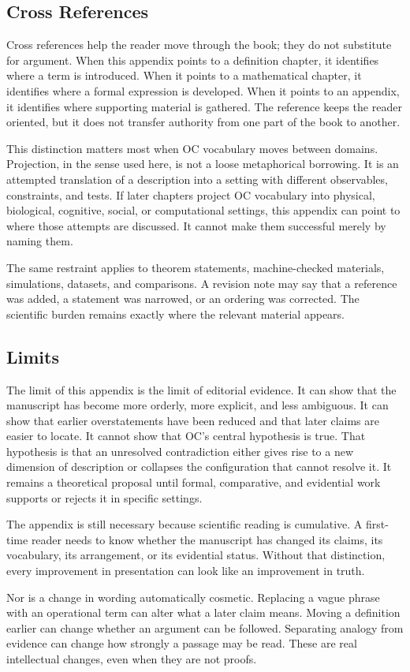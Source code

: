 \documentclass[11pt,a4paper,openany]{book}
\begin{document}
\subsection{Cross References}
Cross references help the reader move through the book; they do not substitute for argument. When this appendix points to a definition chapter, it identifies where a term is introduced. When it points to a mathematical chapter, it identifies where a formal expression is developed. When it points to an appendix, it identifies where supporting material is gathered. The reference keeps the reader oriented, but it does not transfer authority from one part of the book to another. \cite{grimmett_percolation,goldenfeld_lectures}\par
This distinction matters most when OC vocabulary moves between domains. Projection, in the sense used here, is not a loose metaphorical borrowing. It is an attempted translation of a description into a setting with different observables, constraints, and tests. If later chapters project OC vocabulary into physical, biological, cognitive, social, or computational settings, this appendix can point to where those attempts are discussed. It cannot make them successful merely by naming them.\par
The same restraint applies to theorem statements, machine-checked materials, simulations, datasets, and comparisons. A revision note may say that a reference was added, a statement was narrowed, or an ordering was corrected. The scientific burden remains exactly where the relevant material appears.\par
\subsection{Limits}
The limit of this appendix is the limit of editorial evidence. It can show that the manuscript has become more orderly, more explicit, and less ambiguous. It can show that earlier overstatements have been reduced and that later claims are easier to locate. It cannot show that OC's central hypothesis is true. That hypothesis is that an unresolved contradiction either gives rise to a new dimension of description or collapses the configuration that cannot resolve it. It remains a theoretical proposal until formal, comparative, and evidential work supports or rejects it in specific settings. \cite{grimmett_percolation,goldenfeld_lectures}\par
The appendix is still necessary because scientific reading is cumulative. A first-time reader needs to know whether the manuscript has changed its claims, its vocabulary, its arrangement, or its evidential status. Without that distinction, every improvement in presentation can look like an improvement in truth.\par
Nor is a change in wording automatically cosmetic. Replacing a vague phrase with an operational term can alter what a later claim means. Moving a definition earlier can change whether an argument can be followed. Separating analogy from evidence can change how strongly a passage may be read. These are real intellectual changes, even when they are not proofs.\par
\end{document}

